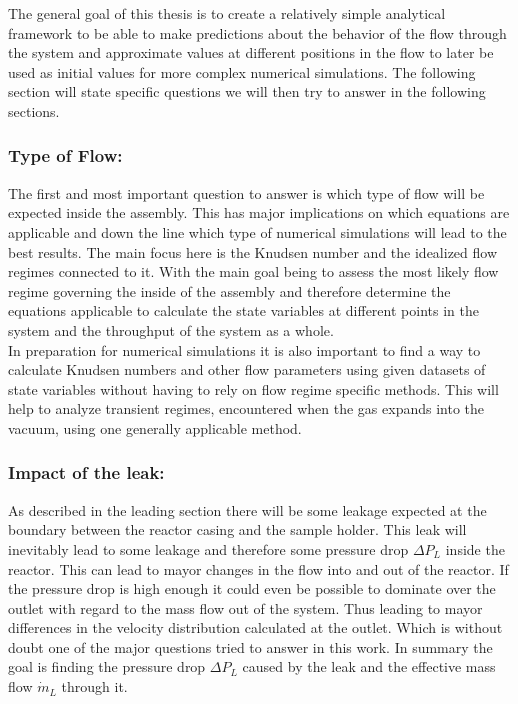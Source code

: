 
	The general goal of this thesis is to create a relatively simple analytical framework to be able to make predictions about the behavior of the flow through the system and approximate values at different positions in the flow to later be used as initial values for more complex numerical simulations.
	The following section will state specific questions we will then try to answer in the following sections.
	
\subsubsection{Type of Flow:}

	The first and most important question to answer is which type of flow will be expected inside the assembly.
	This has major implications on which equations are applicable and down the line which type of numerical simulations will lead to the best results.
	The main focus here is the Knudsen number and the idealized flow regimes connected to it.
	With the main goal being to assess the most likely flow regime governing the inside of the assembly and therefore determine the equations applicable to calculate the state variables at different points in the system and the throughput of the system as a whole.\\
	In preparation for numerical simulations it is also important to find a way to calculate Knudsen numbers and other flow parameters using given datasets of state variables without having to rely on flow regime specific methods. This will help to analyze transient regimes, encountered when the gas expands into the vacuum, using one generally applicable method.  

\subsubsection{Impact of the leak:}

	As described in the leading section there will be some leakage expected at the boundary between the reactor casing and the sample holder.
	This leak will inevitably lead to some leakage and therefore some pressure drop $\Delta P_L$ inside the reactor.
	This can lead to mayor changes in the flow into and out of the reactor.
	If the pressure drop is high enough it could even be possible to dominate over the outlet with regard to the mass flow out of the system.
	Thus leading to mayor differences in the velocity distribution calculated at the outlet.
	Which is without doubt one of the major questions tried to answer in this work.
	In summary the goal is finding the pressure drop $\Delta P_L$ caused by the leak and the effective mass flow $\dot{m}_L$ through it.
	
